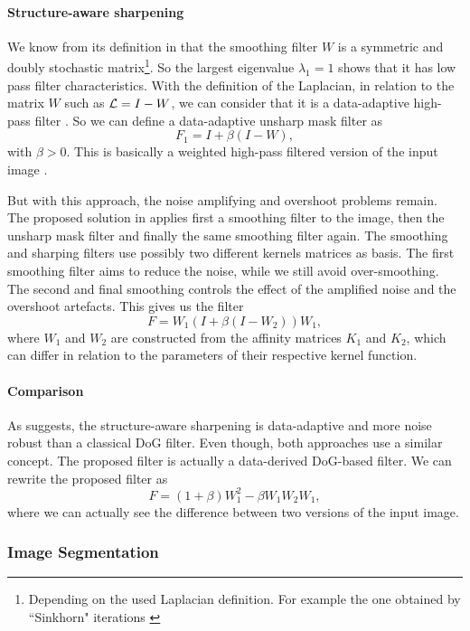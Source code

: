 \paragraph{Structure-aware sharpening}
We know from its definition in \cite{kheradmand_non-linear_2015} that the smoothing filter \(W\) is a symmetric and doubly stochastic matrix\footnote{Depending on the used Laplacian definition. For example the one obtained by ``Sinkhorn" iterations \cite{milanfar_symmetrizing_2013}}.
So the largest eigenvalue \(\lambda_1 = 1\) shows that it has low pass filter characteristics.
With the definition of the Laplacian, in relation to the matrix \(W\) such as \(\operatorname{\mathcal{L}} = I - W\), we can consider that it is a data-adaptive high-pass filter \cite{kheradmand_graph-based_2016}.
So we can define a data-adaptive unsharp mask filter as
\[F_1 = I + \beta (I-W),\]
with \(\beta > 0\). This is basically a weighted high-pass filtered version of the input image \cite{siam_slides_2016}.

But with this approach, the noise amplifying and overshoot problems remain.
The proposed solution in \cite{kheradmand_non-linear_2015} applies first a smoothing filter to the image, then the unsharp mask filter and finally the same smoothing filter again.
The smoothing and sharping filters use possibly two different kernels matrices as basis.
The first smoothing filter aims to reduce the noise, while we still avoid over-smoothing.
The second and final smoothing controls the effect of the amplified noise and the overshoot artefacts.
This gives us the filter
\[F = W_1(I + \beta (I - W_2))W_1,\]
where \(W_1\) and \(W_2\) are constructed from the affinity matrices \(K_1\) and \(K_2\), which can differ in relation to the parameters of their respective kernel function.

\paragraph{Comparison}
As \cite{kheradmand_non-linear_2015} suggests, the structure-aware sharpening is data-adaptive and more noise robust than a classical DoG filter.
Even though, both approaches use a similar concept.
The proposed filter is actually a data-derived DoG-based filter.
We can rewrite the proposed filter as
\[F = (1+\beta) W_1^2 - \beta W_1 W_2 W_1,\]
where we can actually see the difference between two versions of the input image.

\subsubsection{Image Segmentation}

